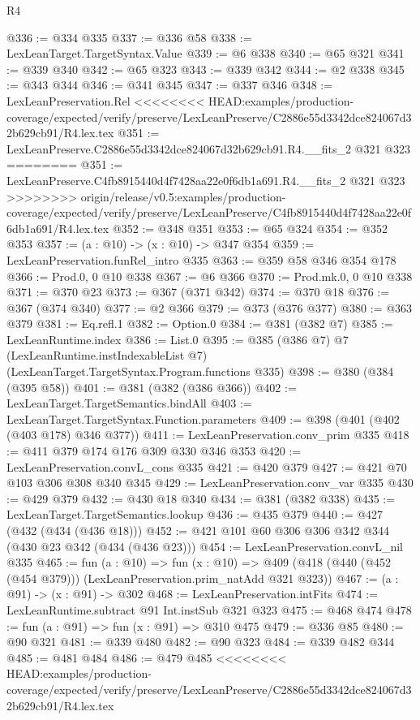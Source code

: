 \begin{lexlean}{R4}
\begin{coremodule}
{{{{{{{{{{{{{{{{{{{{@336 := @334 @335
@337 := @336 @58
@338 := LexLeanTarget.TargetSyntax.Value
@339 := @6 @338
@340 := @65 @321
@341 := @339 @340
@342 := @65 @323
@343 := @339 @342
@344 := @2 @338
@345 := @343 @344
@346 := @341 @345
@347 := @337 @346
@348 := LexLeanPreservation.Rel
<<<<<<<< HEAD:examples/production-coverage/expected/verify/preserve/LexLeanPreserve/C2886e55d3342dce824067d32b629cb91/R4.lex.tex
@351 := LexLeanPreserve.C2886e55d3342dce824067d32b629cb91.R4.__fits_2 @321 @323
========
@351 := LexLeanPreserve.C4fb8915440d4f7428aa22e0f6db1a691.R4.__fits_2 @321 @323
>>>>>>>> origin/release/v0.5:examples/production-coverage/expected/verify/preserve/LexLeanPreserve/C4fb8915440d4f7428aa22e0f6db1a691/R4.lex.tex
@352 := @348 @351
@353 := @65 @324
@354 := @352 @353
@357 := (a : @10) -> (x : @10) -> @347 @354
@359 := LexLeanPreservation.funRel_intro @335
@363 := @359 @58 @346 @354 @178
@366 := Prod.{0, 0} @10 @338
@367 := @6 @366
@370 := Prod.mk.{0, 0} @10 @338
@371 := @370 @23
@373 := @367 (@371 @342)
@374 := @370 @18
@376 := @367 (@374 @340)
@377 := @2 @366
@379 := @373 (@376 @377)
@380 := @363 @379
@381 := Eq.refl.{1}
@382 := Option.{0}
@384 := @381 (@382 @7)
@385 := LexLeanRuntime.index
@386 := List.{0}
@395 := @385
    (@386 @7)
    @7
    (LexLeanRuntime.instIndexableList @7)
    (LexLeanTarget.TargetSyntax.Program.functions @335)
@398 := @380 (@384 (@395 @58))
@401 := @381 (@382 (@386 @366))
@402 := LexLeanTarget.TargetSemantics.bindAll
@403 := LexLeanTarget.TargetSyntax.Function.parameters
@409 := @398 (@401 (@402 (@403 @178) @346 @377))
@411 := LexLeanPreservation.conv_prim @335
@418 := @411 @379 @174 @176 @309 @330 @346 @353
@420 := LexLeanPreservation.convL_cons @335
@421 := @420 @379
@427 := @421 @70 @103 @306 @308 @340 @345
@429 := LexLeanPreservation.conv_var @335
@430 := @429 @379
@432 := @430 @18 @340
@434 := @381 (@382 @338)
@435 := LexLeanTarget.TargetSemantics.lookup
@436 := @435 @379
@440 := @427 (@432 (@434 (@436 @18)))
@452 := @421 @101 @60 @306 @306 @342 @344 (@430 @23 @342 (@434 (@436 @23)))
@454 := LexLeanPreservation.convL_nil @335
@465 := fun (a : @10) =>
  fun (x : @10) => @409 (@418 (@440 (@452 (@454 @379))) (LexLeanPreservation.prim_natAdd @321 @323))
@467 := (a : @91) -> (x : @91) -> @302
@468 := LexLeanPreservation.intFits
@474 := LexLeanRuntime.subtract @91 Int.instSub @321 @323
@475 := @468 @474
@478 := fun (a : @91) => fun (x : @91) => @310 @475
@479 := @336 @85
@480 := @90 @321
@481 := @339 @480
@482 := @90 @323
@484 := @339 @482 @344
@485 := @481 @484
@486 := @479 @485
<<<<<<<< HEAD:examples/production-coverage/expected/verify/preserve/LexLeanPreserve/C2886e55d3342dce824067d32b629cb91/R4.lex.tex
}}}}}}}}}}}}}}}}}}}}
\end{coremodule}
\end{lexlean}
